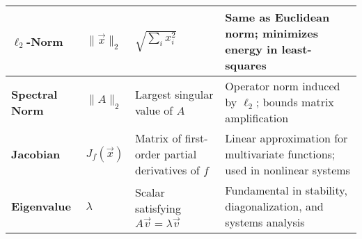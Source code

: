 \documentclass[12pt]{article}
\begin{document}
\begin{longtable}{|>{\bfseries}m{2.5cm}|m{2.5cm}|p{4.6cm}|p{7cm}|}
  \hline
  $\ell_2$-Norm & $\lVert\vec{x}\rVert_2$ & $\sqrt{\sum_i x_i^2}$ &
  Same as Euclidean norm; minimizes energy in least-squares \\
  \hline
  Spectral Norm & $\lVert A\rVert_2$ & Largest singular value of $A$
  & Operator norm induced by $\ell_2$; bounds matrix amplification \\
  \hline
  Jacobian & $J_f(\vec{x})$ & Matrix of first-order partial
  derivatives of $f$ & Linear approximation for multivariate
  functions; used in nonlinear systems \\
  \hline
  Eigenvalue & $\lambda$ & Scalar satisfying $A\vec{v} =
  \lambda\vec{v}$ & Fundamental in stability, diagonalization, and
  systems analysis \\

\end{longtable}
\end{document}
